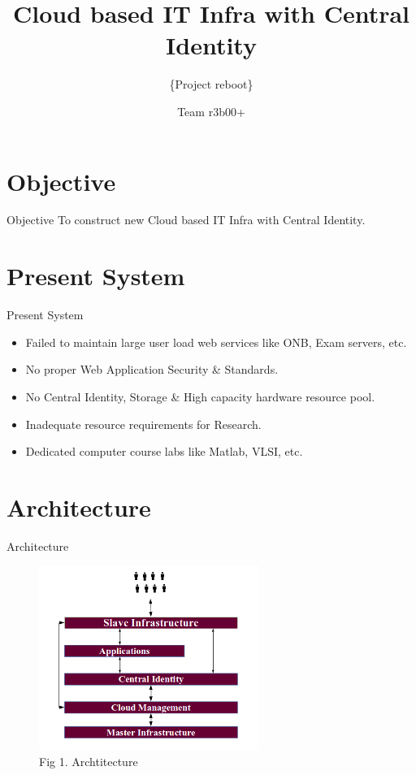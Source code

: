 \documentclass[xcolor=dvipsnames]{beamer}
\title[Cloud based IT Infra with Central Identity]{Cloud based IT Infra with Central Identity}
\subtitle{\{Project reboot\}}
\author{Team r3b00+}
\institute{Dept. of CSE, RGUKT - Nuzvid}
\begin{document}
\begin{frame}
\titlepage
\end{frame}




\section{Objective}
\begin{frame}{Objective}
To construct new Cloud based IT Infra with Central Identity.
\end{frame}

\section{Present System}
\begin{frame}{Present System}

\begin{itemize}
	\item Failed to maintain large user load web services like ONB, Exam servers, etc.
	\item No proper Web Application Security \& Standards.
	\item No Central Identity, Storage \& High capacity hardware resource pool.
	\item Inadequate resource requirements for Research.
	\item Dedicated computer course labs like Matlab, VLSI, etc. 
\end{itemize}

\end{frame}


\section{Architecture}
\begin{frame}{Architecture}
\begin{figure}[H]
 \includegraphics[height=6cm]{./idea.png} \\
 Fig 1. Archtitecture 
\end{figure}
\end{frame}
\end{document}
